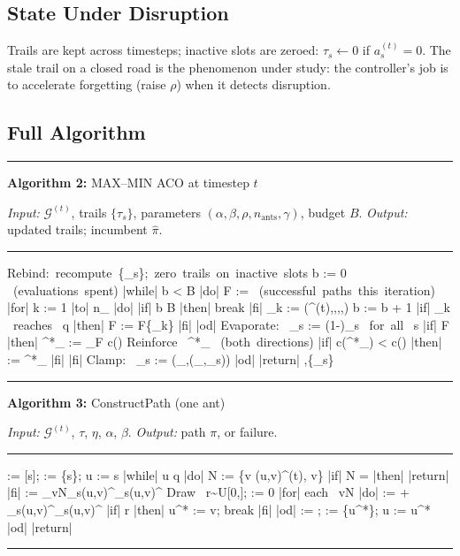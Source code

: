 \documentclass[11pt,a4paper]{article}
\theoremstyle{definition}
\newcommand{\calG}{\mathcal{G}}
\newcommand{\calE}{\mathcal{E}}
\begin{document}
\subsection{State Under Disruption}

Trails are kept across timesteps; inactive slots are zeroed:
$\tau_s\leftarrow 0$ if $a_s^{(t)}=0$.
The stale trail on a closed road is the phenomenon under study: the controller's job is
to accelerate forgetting (raise $\rho$) when it detects disruption.

\subsection{Full Algorithm}

\begin{center}
\begin{minipage}{0.88\linewidth}
\hrule\medskip
\textbf{Algorithm 2:} MAX--MIN ACO at timestep $t$

\smallskip\textit{Input:} $\calG^{(t)}$, trails $\{\tau_s\}$,
parameters $(\alpha,\beta,\rho,n_{\text{ants}},\gamma)$, budget $B$.
\textit{Output:} updated trails; incumbent $\hat\pi$.
\hrule\medskip
\begin{program}
\mbox{Rebind: recompute }\{\eta_s\};\mbox{ zero trails on inactive slots}
b := 0 \mbox{ (evaluations spent)}
|while| b < B |do|
  F := \emptyset \mbox{ (successful paths this iteration)}
  |for| k := 1 |to| n_{} |do|
    |if| b \ge B |then| \mbox{break} |fi|
    \pi_k := (\calG^{(t)},\tau,\eta,\alpha,\beta)
    b := b + 1
    |if| \pi_k \mbox{ reaches } q |then| F := F\cup\{\pi_k\} |fi|
  |od|
  \mbox{Evaporate: } \tau_s := (1-\rho)\tau_s \mbox{ for all } s
  |if| F \ne \emptyset |then|
    \pi^*_{} := \arg\min_{\pi\in F} c(\pi)
    \mbox{Reinforce } \pi^*_{} \mbox{ (both directions)}
    |if| c(\pi^*_{}) < c(\hat\pi) |then| \hat\pi := \pi^*_{} |fi|
  |fi|
  \mbox{Clamp: } \tau_s := \min(\tau_{\max},\max(\tau_{\min},\tau_s))
|od|
|return| \hat\pi,\;\{\tau_s\}
\end{program}
\hrule\medskip
\textbf{Algorithm 3:} ConstructPath (one ant)

\smallskip\textit{Input:} $\calG^{(t)}$, $\tau$, $\eta$, $\alpha$, $\beta$.
\textit{Output:} path $\pi$, or failure.
\hrule\medskip
\begin{program}
\pi := [s];\;  := \{s\};\; u := s
|while| u \ne q |do|
  N := \{v \mid (u,v)\in\calE^{(t)},\; v\notin {}\}
  |if| N = \emptyset |then| |return|  |fi|
  \Sigma := \textstyle\sum_{v\in N}\tau_{s(u,v)}^\alpha\eta_{s(u,v)}^\beta
  \mbox{Draw } r\sim U[0,\Sigma];\;  := 0
  |for| \mbox{each } v\in N |do|
     :=  + \tau_{s(u,v)}^\alpha\eta_{s(u,v)}^\beta
    |if|  \ge r |then| u^* := v;\; \mbox{break} |fi|
  |od|
  \pi := \pi\cdot[u^*];\;  := \cup\{u^*\};\; u := u^*
|od|
|return| \pi
\end{program}
\hrule
\end{minipage}
\end{center}
\end{document}
